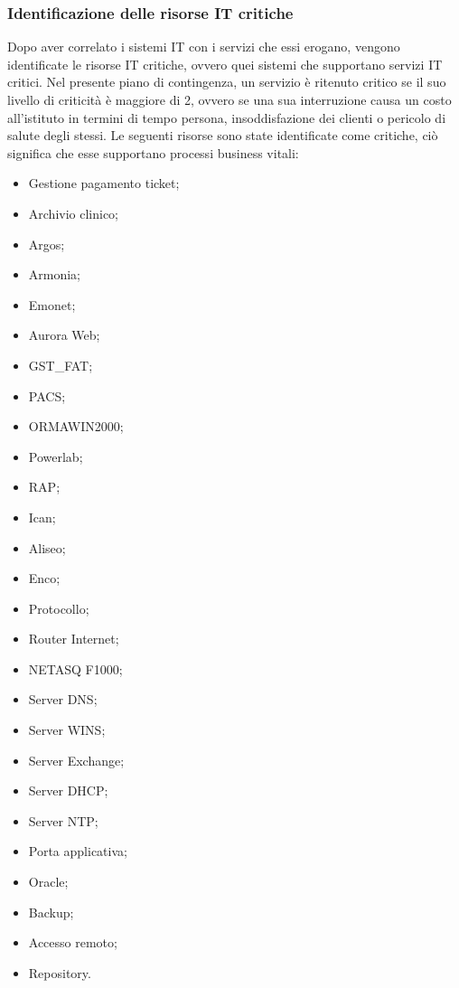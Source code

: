 \documentclass[12pt, a4paper, titlepage]{report}
\begin{document}
		\subsubsection{Identificazione delle risorse IT critiche}
		
		Dopo aver correlato i sistemi IT con i servizi che essi erogano, vengono identificate le risorse IT critiche, ovvero quei sistemi che supportano servizi IT critici. Nel presente piano di contingenza, un servizio è ritenuto critico se il suo livello di criticità è maggiore di 2, ovvero se una sua interruzione causa un costo all'istituto in termini di tempo persona, insoddisfazione dei clienti o pericolo di salute degli stessi. Le seguenti risorse sono state identificate come critiche, ciò significa che esse supportano processi business vitali:
		\begin{itemize}
				\item Gestione pagamento ticket; 
				\item Archivio clinico;
				\item Argos;
				\item Armonia; 
				\item Emonet;
				\item Aurora Web;
				\item GST\_FAT; 
				\item PACS; 
				\item ORMAWIN2000; 
				\item Powerlab; 
				\item RAP; 
				\item Ican; 
				\item Aliseo; 
				\item Enco;
				\item Protocollo; 
				\item Router Internet; 
				\item NETASQ F1000; 
				\item Server DNS; 
				\item Server WINS; 
				\item Server Exchange; 
				\item Server DHCP; 
				\item Server NTP; 
				\item Porta applicativa; 
				\item Oracle; 
				\item Backup; 
				\item Accesso remoto; 
				\item Repository. 
		\end{itemize}
		
\end{document}

